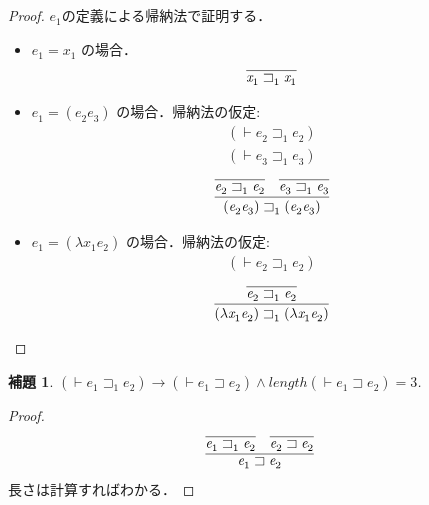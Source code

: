 \documentclass{ltjsbook}%
\newtheorem{lemma}{補題}[section]%
\begin{document}
\begin{proof}%
  $\mathit{e}_1^{}$の定義による帰納法で証明する．%
  \begin{itemize}%
  \item $\mathit{e}_1^{}=\mathit{x}_1^{}$ の場合．%
    \begin{equation}%
      \infer{%
        \mathit{x}_1^{}\sqsupset_1^{}\mathit{x}_1^{}%
      }{%
      }%
    \end{equation}%
  \item $\mathit{e}_1^{}=(\mathit{e}_2^{}\mathit{e}_3^{})$ の場合．帰納法の仮定:%
    \begin{align}%
      (\vdash\mathit{e}_2^{}\sqsupset_1^{}\mathit{e}_2^{})\\%
      (\vdash\mathit{e}_3^{}\sqsupset_1^{}\mathit{e}_3^{})%
    \end{align}%
    \begin{equation}%
      \infer{%
        (\mathit{e}_2^{}\mathit{e}_3^{})\sqsupset_1^{}(\mathit{e}_2^{}\mathit{e}_3^{})%
      }{%
        \infer{%
          \mathit{e}_2^{}\sqsupset_1^{}\mathit{e}_2^{}%
        }{%
        }%
      &%
        \infer{%
          \mathit{e}_3^{}\sqsupset_1^{}\mathit{e}_3^{}%
        }{%
        }%
      }%
    \end{equation}%
  \item $\mathit{e}_1^{}=(\lambda\mathit{x}_1^{}\mathit{e}_2^{})$ の場合．帰納法の仮定:%
    \begin{align}%
      (\vdash\mathit{e}_2^{}\sqsupset_1^{}\mathit{e}_2^{})%
    \end{align}%
    \begin{equation}%
      \infer{%
        (\lambda\mathit{x}_1^{}\mathit{e}_2^{})\sqsupset_1^{}(\lambda\mathit{x}_1^{}\mathit{e}_2^{})%
      }{%
        \infer{%
          \mathit{e}_2^{}\sqsupset_1^{}\mathit{e}_2^{}%
        }{%
        }%
      }%
    \end{equation}%
  \end{itemize}%
\end{proof}%
\begin{lemma}%
  \label{lemma:par_reduct1n}%
  $(\vdash\mathit{e}_1^{}\sqsupset_1^{}\mathit{e}_2^{})\rightarrow%
  (\vdash\mathit{e}_1^{}\sqsupset\mathit{e}_2^{})\land length(\vdash\mathit{e}_1^{}\sqsupset\mathit{e}_2^{})=3$.%
\end{lemma}%
\begin{proof}%
  \begin{equation}%
    \infer{%
      \mathit{e}_1^{}\sqsupset\mathit{e}_2^{}%
    }{%
      \infer{\mathit{e}_1^{}\sqsupset_1^{}\mathit{e}_2^{}}{}%
    &%
      \infer{\mathit{e}_2^{}\sqsupset\mathit{e}_2^{}}{}%
    }%
  \end{equation}%
  長さは計算すればわかる．%
\end{proof}%
\end{document}

